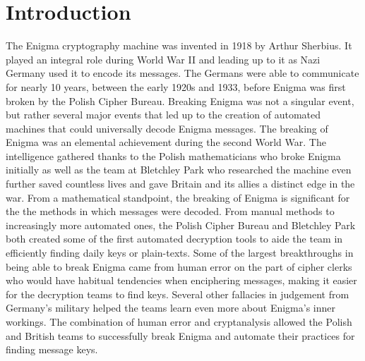 \chapter{Introduction}\label{chap:introduction}

The Enigma cryptography machine was invented in 1918 by Arthur Sherbius. It played an integral role during World War II and leading up to it as Nazi Germany used it to encode its messages. The Germans were able to communicate for nearly 10 years, between the early 1920s and 1933, before Enigma was first broken by the Polish Cipher Bureau. Breaking Enigma was not a singular event, but rather several major events that led up to the creation of automated machines that could universally decode Enigma messages. The breaking of Enigma was an elemental achievement during the second World War. The intelligence gathered thanks to the Polish mathematicians who broke Enigma initially as well as the team at Bletchley Park who researched the machine even further saved countless lives and gave Britain and its allies a distinct edge in the war. From a mathematical standpoint, the breaking of Enigma is significant for the the methods in which messages were decoded. From manual methods to increasingly more automated ones, the Polish Cipher Bureau and Bletchley Park both created some of the first automated decryption tools to aide the team in efficiently finding daily keys or plain-texts. Some of the largest breakthroughs in being able to break Enigma came from human error on the part of cipher clerks who would have habitual tendencies when enciphering messages, making it easier for the decryption teams to find keys. Several other fallacies in judgement from Germany’s military helped the teams learn even more about Enigma’s inner workings. The combination of human error and cryptanalysis allowed the Polish and British teams to successfully break Enigma and automate their practices for finding message keys.
